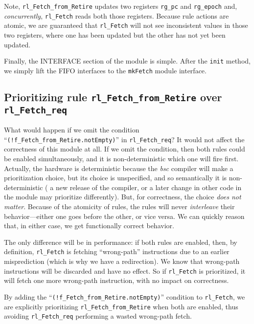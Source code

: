 Note, \verb|rl_Fetch_from_Retire| updates two registers \verb|rg_pc|
and \verb|rg_epoch| and, \emph{concurrently}, \verb|rl_Fetch| reads
both those registers.  Because rule actions are atomic, we are
guaranteed that \verb|rl_Fetch| will not see inconsistent values in
those two registers, where one has been updated but the other has not
yet been updated.

Finally, the INTERFACE section of the module is simple.  After the
\verb|init| method, we simply lift the FIFO interfaces to the
\verb|mkFetch| module interface.


\subsection{Prioritizing rule {\tt rl\_Fetch\_from\_Retire} over {\tt rl\_Fetch\_req}}


What would happen if we omit the condition
``\verb|(!f_Fetch_from_Retire.notEmpty)|'' in \verb|rl_Fetch_req|?  It
would not affect the correctness of this module at all.  If we omit
the condition, then both rules could be enabled simultaneously, and it
is non-deterministic which one will fire first.  Actually, the
hardware is deterministic because the \emph{bsc} compiler will make a
prioritization choice, but its choice is unspecified, and so
semantically it is non-deterministic ({\eg} a new release of the
compiler, or a later change in other code in the module may prioritize
differently).  But, for correctness, the choice \emph{does not
matter}.  Because of the atomicity of rules, the rules will never
\emph{interleave} their behavior---either one goes before the other,
or vice versa.  We can quickly reason that, in either case, we get
functionally correct behavior.

The only difference will be in performance: if both rules are enabled,
then, by definition, \verb|rl_Fetch| is fetching ``wrong-path''
instructions due to an earlier misprediction (which is why we have a
redirection).  We know that wrong-path instructions will be discarded
and have no effect.  So if \verb|rl_Fetch| is prioritized, it will
fetch one more wrong-path instruction, with no impact on correctness.

By adding the ``\verb|(!f_Fetch_from_Retire.notEmpty)|'' condition to
\verb|rl_Fetch|, we are explicitly prioritizing
\verb|rl_Fetch_from_Retire| when both are enabled, thus avoiding
\verb|rl_Fetch_req| performing a wasted wrong-path fetch.


